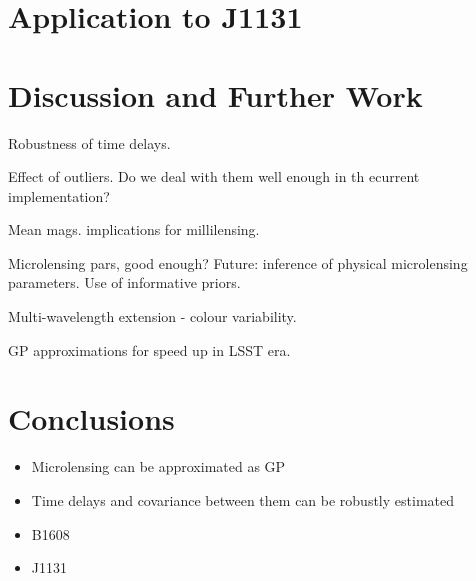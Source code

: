 \documentclass[useAMS,usenatbib, a4paper]{mn2e} \usepackage{natbib}
\begin{document}


\section{Application to J1131}

\citep{2006astro.ph..5321M}



\section{Discussion and Further Work}

Robustness of time delays.

Effect of outliers. Do we deal with them well enough in th ecurrent implementation?

Mean mags. implications for millilensing.

Microlensing pars, good enough? Future: inference of physical microlensing parameters. 
Use of informative priors.

Multi-wavelength extension - colour variability.

GP approximations for speed up in LSST era.



\section{Conclusions}

\begin{itemize}
\item Microlensing can be approximated as GP
\item Time delays and covariance between them can be robustly estimated
\item B1608
\item J1131
\end{itemize}
\end{document}
